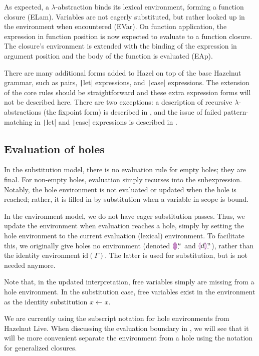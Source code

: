 As expected, a $\lambda$-abstraction binds its lexical environment, forming a function closure (ELam). Variables are not eagerly substituted, but rather looked up in the environment when encountered (EVar). On function application, the expression in function position is now expected to evaluate to a function closure. The closure's environment is extended with the binding of the expression in argument position and the body of the function is evaluated (EAp).

There are many additional forms added to Hazel on top of the base Hazelnut grammar, such as pairs, \texttt|let| expressions, and \texttt|case| expressions. The extension of the core rules should be straightforward and these extra expression forms will not be described here. There are two exceptions: a description of recursive $\lambda$-abstractions (the fixpoint form) is described in , and the issue of failed pattern-matching in \texttt|let| and \texttt|case| expressions is described in .

\subsection{Evaluation of holes}
\label{sec:holeenv_evalenv_connection}

In the substitution model, there is no evaluation rule for empty holes; they are final. For non-empty holes, evaluation simply recurses into the subexpression. Notably, the hole environment is not evaluated or updated when the hole is reached; rather, it is filled in by substitution when a variable in scope is bound.

In the environment model, we do not have eager substitution passes. Thus, we update the environment when evaluation reaches a hole, simply by setting the hole environment to the current evaluation (lexical) environment. To facilitate this, we originally give holes no environment (denoted $\textcolor{violet}{\llparenthesis}\textcolor{violet}{\rrparenthesis}_\cdot^u$ and $\textcolor{violet}{\llparenthesis} d\textcolor{violet}{\rrparenthesis}_\cdot^u$), rather than the identity environment $\text{id}(\Gamma)$. The latter is used for substitution, but is not needed anymore.

Note that, in the updated interpretation, free variables simply are missing from a hole environment. In the substitution case, free variables exist in the environment as the identity substitution $x\leftarrow x$.

We are currently using the subscript notation for hole environments from Hazelnut Live. When discussing the evaluation boundary in , we will see that it will be more convenient separate the environment from a hole using the notation for generalized closures.


